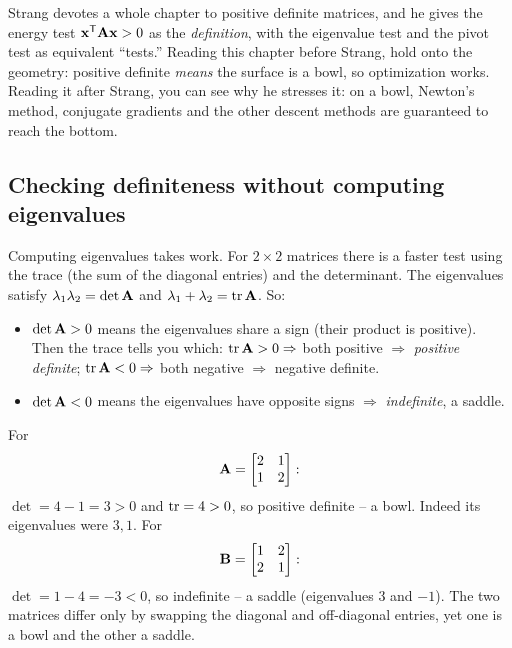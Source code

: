 \begin{strangbox}
Strang devotes a whole chapter to positive definite matrices, and he gives
the energy test $\mathbf{x}^{\mathsf{T}}\mathbf{A}\mathbf{x}>0$ as the \emph{definition}, with the
eigenvalue test and the pivot test as equivalent ``tests.'' Reading this chapter
before Strang, hold onto the geometry: positive definite \emph{means} the surface is
a bowl, so optimization works. Reading it after Strang, you can see why he stresses
it: on a bowl, Newton's method, conjugate gradients and the other descent methods are
guaranteed to reach the bottom.
\end{strangbox}

\subsection{Checking definiteness without computing eigenvalues}

Computing eigenvalues takes work. For $2\times 2$ matrices there is a faster
test using the trace (the sum of the diagonal entries) and the determinant. The
eigenvalues satisfy $\lambda_1\lambda_2=\det\mathbf{A}$ and $\lambda_1+\lambda_2=\operatorname{tr}\mathbf{A}$. So:

\begin{itemize}
\item $\det\mathbf{A}>0$ means the eigenvalues share a sign (their product is
positive). Then the trace tells you which: $\operatorname{tr}\mathbf{A}>0 \Rightarrow$ both positive
$\Rightarrow$ \emph{positive definite}; $\operatorname{tr}\mathbf{A}<0 \Rightarrow$ both negative
$\Rightarrow$ negative definite.
\item $\det\mathbf{A}<0$ means the eigenvalues have opposite signs $\Rightarrow$
\emph{indefinite}, a saddle.
\end{itemize}

\begin{example}
\label{ch36:ex-tracedet}
For
\[
  \mathbf{A}=\begin{bmatrix}2&1\\1&2\end{bmatrix}:
\]
$\det=4-1=3>0$ and $\operatorname{tr}=4>0$, so
positive definite -- a bowl. Indeed its eigenvalues were $3,1$. For
\[
  \mathbf{B}=\begin{bmatrix}1&2\\2&1\end{bmatrix}:
\]
$\det=1-4=-3<0$, so indefinite -- a
saddle (eigenvalues $3$ and $-1$). The two matrices differ only by swapping the
diagonal and off-diagonal entries, yet one is a bowl and the other a saddle.
\end{example}

